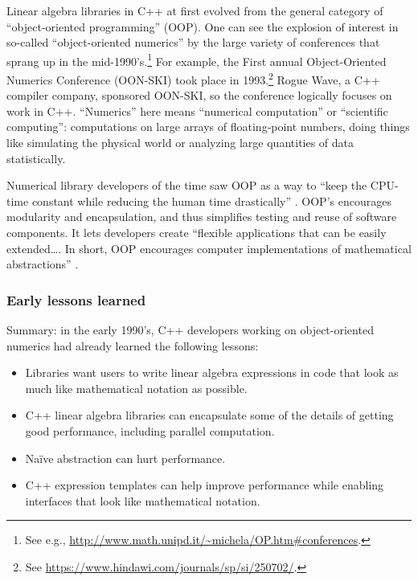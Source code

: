 Linear algebra libraries in C++ at first evolved from the general
category of ``object-oriented programming'' (OOP).  One can see the
explosion of interest in so-called ``object-oriented numerics'' by the
large variety of conferences that sprang up in the
mid-1990's.\footnote{See e.g.,
  \url{http://www.math.unipd.it/~michela/OP.htm\#conferences}.}  For
example, the First annual Object-Oriented Numerics Conference
(OON-SKI) took place in 1993.\footnote{See
  \url{https://www.hindawi.com/journals/sp/si/250702/}.} Rogue Wave, a
C++ compiler company, sponsored OON-SKI, so the conference logically
focuses on work in C++.  ``Numerics'' here means ``numerical
computation'' or ``scientific computing'': computations on large
arrays of floating-point numbers, doing things like simulating the
physical world or analyzing large quantities of data statistically.

Numerical library developers of the time saw OOP as a way to ``keep
the CPU-time constant while reducing the human time
drastically'' \cite{arge1996oon}.  OOP's encourages modularity and
encapsulation, and thus simplifies testing and reuse of software
components. It lets developers create ``flexible applications that can
be easily extended\dots.  In short, OOP encourages computer
implementations of mathematical abstractions'' \cite{arge1996oon}.

\subsubsection{Early lessons learned}
\label{SSS:90s:OON:early}

Summary: in the early 1990's, C++ developers working on
object-oriented numerics had already learned the following lessons:
\begin{itemize}
\item Libraries want users to write linear algebra expressions in code
  that look as much like mathematical notation as possible.
\item C++ linear algebra libraries can encapsulate some of the details
  of getting good performance, including parallel computation.
\item Na\"ive abstraction can hurt performance.
\item C++ expression templates can help improve performance while
  enabling interfaces that look like mathematical notation.
\end{itemize}

